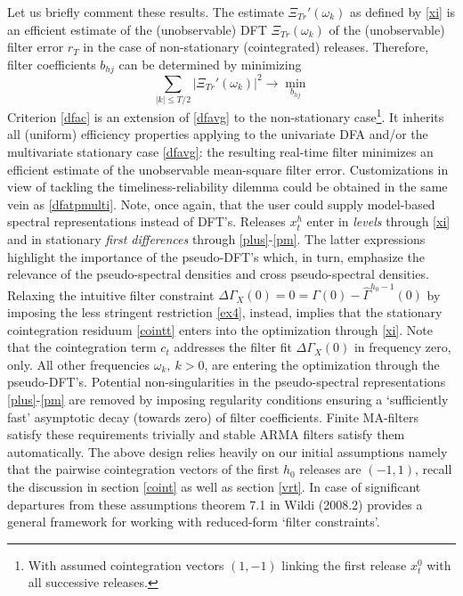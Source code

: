 \documentclass[11pt]{article}
\begin{document}
Let us briefly comment these results. The estimate $\Xi_{Tr}'(\omega_k)$ as defined by \ref{xi} is an efficient estimate of the (unobservable) DFT $\Xi_{Tr}(\omega_k)$ of the (unobservable) filter error $r_T$ in the case of non-stationary (cointegrated) releases. Therefore, filter coefficients $b_{hj}$  can be determined by minimizing
\begin{equation}\label{dfac}
\sum_{|k|\leq T/2}\left|\Xi_{Tr}'(\omega_k)\right|^2\to \min_{b_{hj}}
\end{equation}
Criterion \ref{dfac} is an extension of \ref{dfavg} to the non-stationary case\footnote{With assumed cointegration vectors $(1,-1)$ linking the first release $x_t^0$ with all successive releases.}. It inherits all (uniform) efficiency properties applying to the univariate DFA and/or the multivariate stationary case \ref{dfavg}: the resulting real-time filter minimizes an efficient estimate of the unobservable mean-square filter error. Customizations in view of tackling the timeliness-reliability dilemma could be obtained in the same vein as \ref{dfatpmulti}. Note, once again, that the user could supply model-based spectral representations instead of DFT's. Releases $x_t^h$ enter in \emph{levels} through \ref{xi} and in stationary \emph{first differences} through \ref{plus}-\ref{pm}. The latter expressions highlight the importance of the pseudo-DFT's which, in turn, emphasize the relevance of the {pseudo-spectral densities} and cross pseudo-spectral densities. Relaxing the intuitive filter constraint $\Delta{\Gamma}_X(0)=0=\Gamma(0)-{\hat{\Gamma}}^{h_0-1}(0)$ by imposing the less stringent restriction \ref{ex4}, instead, implies that the stationary cointegration residuum \ref{cointt} enters into the optimization through \ref{xi}. Note that the cointegration term $c_t$ addresses the filter fit $\Delta{\Gamma}_X(0)$ in frequency zero, only. All other frequencies $\omega_k,~k>0$, are entering the optimization through the pseudo-DFT's. Potential non-singularities in the pseudo-spectral representations \ref{plus}-\ref{pm} are removed by imposing regularity conditions ensuring a `sufficiently fast' asymptotic decay (towards zero) of filter coefficients. Finite MA-filters satisfy these requirements trivially and stable ARMA filters satisfy them automatically. The above design relies heavily on our initial assumptions namely that the pairwise cointegration vectors of the first $h_0$ releases are $(-1,1)$, recall the discussion in section \ref{coint} as well as section \ref{vrt}. In case of significant departures from these assumptions theorem 7.1 in Wildi (2008.2) provides a general framework for working with reduced-form `filter constraints'.
\end{document}
